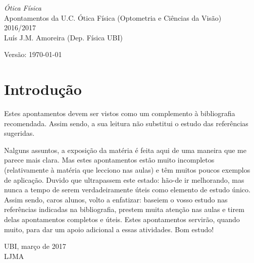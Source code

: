 \begin{titlepage}
\noindent
{\Huge\sffamily\textsl{Ótica Física}}\\[10mm]
{\Large\textsf{Apontamentos da U.C. Ótica Física
(Optometria e Ciências da Visão)}}\\[5mm]
{\Large\textsf 2016/2017}\\[15mm]
{\large\textsf{Luís J.M. Amoreira (Dep. Física UBI)}}

\vspace{35mm}
\noindent
{\small \textsf{Versão: \today}}
\vfill
\begin{center}
\end{center}
\vfill
\end{titlepage}
\thispagestyle{plain}
\section*{Introdução}
Estes apontamentos devem ser vistos como um complemento à bibliografia
recomendada. Assim sendo, a sua leitura não substitui o estudo das 
referências sugeridas.

\noindent
Nalguns assuntos, a exposição da matéria é feita aqui de uma maneira que me
parece mais clara. Mas estes apontamentos estão muito incompletos (relativamente
à matéria que lecciono nas aulas) e têm muitos poucos exemplos de aplicação.
Duvido que ultrapassem este estado: hão-de ir melhorando, mas nunca a tempo de
serem verdadeiramente úteis como elemento de estudo único. Assim sendo, caros
alunos, volto a enfatizar: baseiem o vosso estudo nas referências indicadas na
bibliografia, prestem muita atenção nas aulas e tirem delas apontamentos
completos e úteis. Estes apontamentos servirão, quando muito, para dar um apoio
adicional a essas atividades. 
\noindent
Bom estudo!

\vspace{2cm}
\hfill
\begin{minipage}{0.4\linewidth}
UBI, março de 2017\\
LJMA
\end{minipage}

\vspace{3cm}

